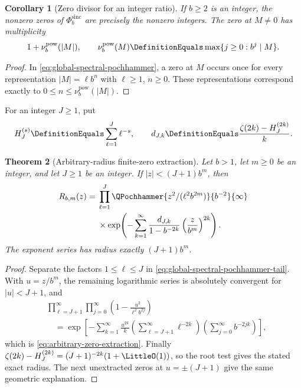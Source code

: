 \documentclass[11pt,oneside]{article}
\numberwithin{equation}{section}
\newtheorem{theorem}{Theorem}[section]
\newtheorem{corollary}[theorem]{Corollary}
\theoremstyle{definition}
\theoremstyle{remark}
\newcommand{\GeometricSincProduct}[1]{\Phi^{\mathrm{sinc}}_{#1}}
\newcommand{\BasePowerValuation}[1]{\nu^{\mathrm{pow}}_{#1}}
\begin{document}
\begin{corollary}[Zero divisor for an integer ratio]
\label{cor:integer-ratio-zero-divisor}
If $b\ge2$ is an integer, the nonzero zeros of $\GeometricSincProduct{b}$ are precisely the nonzero integers.
The zero at $M\ne0$ has multiplicity
\[
 1+\BasePowerValuation{b}(|M|),
 \qquad
 \BasePowerValuation{b}(M)\DefinitionEquals\max\{j\ge0:b^j\mid M\}.
\]
\end{corollary}

\begin{proof}
In \eqref{eq:global-spectral-pochhammer}, a zero at $M$ occurs once for every representation
$|M|=\ell b^n$ with $\ell\ge1$, $n\ge0$.  These representations correspond exactly to
$0\le n\le\BasePowerValuation{b}(|M|)$.
\end{proof}

For an integer $J\ge1$, put
\[
 H_J^{(s)}\DefinitionEquals\sum_{\ell=1}^{J}\ell^{-s},
 \qquad d_{J,k}\DefinitionEquals\frac{\zeta(2k)-H_J^{(2k)}}{k}.
\]

\begin{theorem}[Arbitrary-radius finite-zero extraction]
\label{thm:arbitrary-zero-extraction}
Let $b>1$, let $m\ge0$ be an integer, and let $J\ge1$ be an integer.
If $|z|<(J+1)b^m$, then
\begin{align}
 R_{b,m}(z)
 ={}&\prod_{\ell=1}^{J}
 \QPochhammer{z^2/(\ell^2b^{2m})}{b^{-2}}{\infty} \notag\\
 &\times\exp\!\left(
  -\sum_{k=1}^{\infty}
   \frac{d_{J,k}}{1-b^{-2k}}
   \left(\frac{z}{b^m}\right)^{2k}
 \right).
 \label{eq:arbitrary-zero-extraction}
\end{align}
The exponent series has radius exactly $(J+1)b^m$.
\end{theorem}

\begin{proof}
Separate the factors $1\le\ell\le J$ in
\eqref{eq:global-spectral-pochhammer-tail}.  With $u=z/b^m$, the remaining logarithmic
series is absolutely convergent for $|u|<J+1$, and
\begin{align*}
 &\prod_{\ell=J+1}^{\infty}\prod_{j=0}^{\infty}
 \left(1-\frac{u^2}{\ell^2b^{2j}}\right)\\
 &\quad=\exp\!\left[
  -\sum_{k=1}^{\infty}\frac{u^{2k}}{k}
  \left(\sum_{\ell=J+1}^{\infty}\ell^{-2k}\right)
  \left(\sum_{j=0}^{\infty}b^{-2jk}\right)
 \right],
\end{align*}
which is \eqref{eq:arbitrary-zero-extraction}.  Finally
$\zeta(2k)-H_J^{(2k)}=(J+1)^{-2k}(1+\LittleO(1))$, so the root test gives the stated exact
radius.  The next unextracted zeros at $u=\pm(J+1)$ give the same geometric explanation.
\end{proof}
\end{document}
